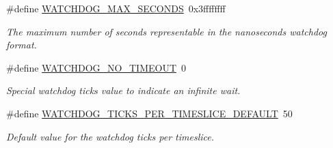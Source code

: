 \begin{DoxyCompactItemize}
\#define \mbox{\hyperlink{group__RTEMSScoreWatchdog_gaa3aa6420a9203fa3a794cba438c1fc5e}{W\+A\+T\+C\+H\+D\+O\+G\+\_\+\+M\+A\+X\+\_\+\+S\+E\+C\+O\+N\+DS}}~0x3ffffffff
\begin{DoxyCompactList}\small\item\em The maximum number of seconds representable in the nanoseconds watchdog format. \end{DoxyCompactList}\item 
\mbox{\label{group__RTEMSScoreWatchdog_gaa7a11d3dcb3ba512032421888d16b327}} 
\#define \mbox{\hyperlink{group__RTEMSScoreWatchdog_gaa7a11d3dcb3ba512032421888d16b327}{W\+A\+T\+C\+H\+D\+O\+G\+\_\+\+N\+O\+\_\+\+T\+I\+M\+E\+O\+UT}}~0
\begin{DoxyCompactList}\small\item\em Special watchdog ticks value to indicate an infinite wait. \end{DoxyCompactList}\item 
\mbox{\label{group__RTEMSScoreWatchdog_gac5df168135dca917b346f8c75c4d2dae}} 
\#define \mbox{\hyperlink{group__RTEMSScoreWatchdog_gac5df168135dca917b346f8c75c4d2dae}{W\+A\+T\+C\+H\+D\+O\+G\+\_\+\+T\+I\+C\+K\+S\+\_\+\+P\+E\+R\+\_\+\+T\+I\+M\+E\+S\+L\+I\+C\+E\+\_\+\+D\+E\+F\+A\+U\+LT}}~50
\begin{DoxyCompactList}\small\item\em Default value for the watchdog ticks per timeslice. \end{DoxyCompactList}\end{DoxyCompactItemize}
